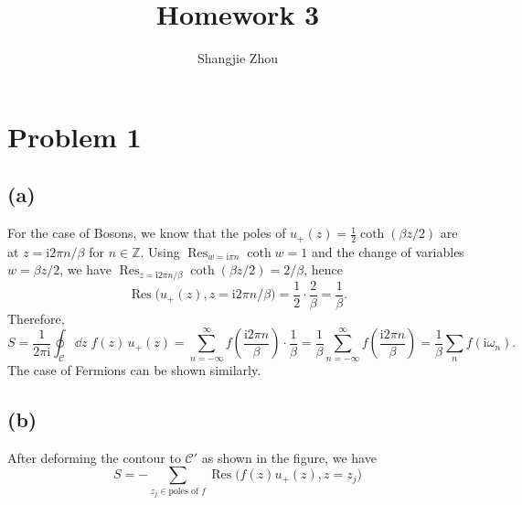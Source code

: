 \documentclass{article}
\title{Homework 3}
\author{Shangjie Zhou}
\newcommand{\ii}{\mathrm{i}}
\begin{document}
\maketitle


\section*{Problem 1}
\subsection*{(a)}
For the case of Bosons, we know that the poles of $u_+(z)=\tfrac{1}{2}\coth(\beta z/2)$ are at $z=\ii 2\pi n/\beta$ for $n\in \mathbb{Z}$. Using $\operatorname*{Res}_{w=\ii\pi n}\coth w=1$ and the change of variables $w=\beta z/2$, we have $\operatorname*{Res}_{z=\ii 2\pi n/\beta}\coth(\beta z/2)=2/\beta$, hence
\begin{equation}
\operatorname*{Res}\big(u_+(z), z=\ii 2\pi n/\beta\big) = \frac{1}{2}\cdot\frac{2}{\beta} = \frac{1}{\beta}.
\end{equation}
Therefore,
\begin{equation}
    S=\frac{1}{2\pi\ii}\oint_\mathcal{C}\dd{z}\; f(z)\,u_+(z)=\sum_{n=-\infty}^{\infty} f\!\left(\frac{\ii 2\pi n}{\beta}\right)\cdot \frac{1}{\beta} = \frac{1}{\beta}\sum_{n=-\infty}^{\infty} f\!\left(\frac{\ii 2\pi n}{\beta}\right)=\frac{1}{\beta}\sum_n f(\ii\omega_n).
\end{equation}
The case of Fermions can be shown similarly.

\subsection*{(b)}
After deforming the contour to $\mathcal{C}'$ as shown in the figure, we have
\begin{equation}
    S=-\sum_{z_j\in\text{poles of }f}\operatorname*{Res}\big(f(z)u_+(z), z=z_j\big) 
\end{equation}
\end{document}
